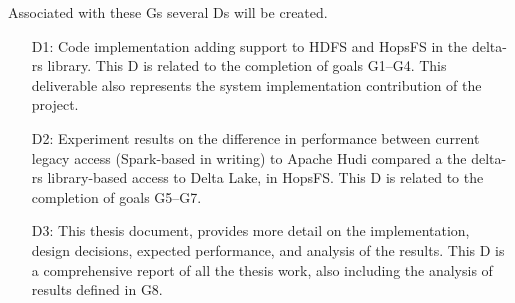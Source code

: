 Associated with these \glspl{G} several \glspl{D} will be created. 
\begin{enumerate}
    \item[D1:] Code implementation adding support to \gls{HDFS} and \gls{HopsFS} in the delta-rs library. This \gls{D} is related to the completion of goals G1--G4. This deliverable also represents the system implementation contribution of the project.
    \item[D2:] Experiment results on the difference in performance between current legacy access (Spark-based in writing) to Apache Hudi compared a the delta-rs library-based access to Delta Lake, in \gls{HopsFS}.
    This \gls{D} is related to the completion of goals G5--G7.
    \item[D3:] This thesis document, provides more detail on the implementation, design decisions, expected performance, and analysis of the results.
    This \gls{D} is a comprehensive report of all the thesis work, also including the analysis of results defined in G8.
\end{enumerate}